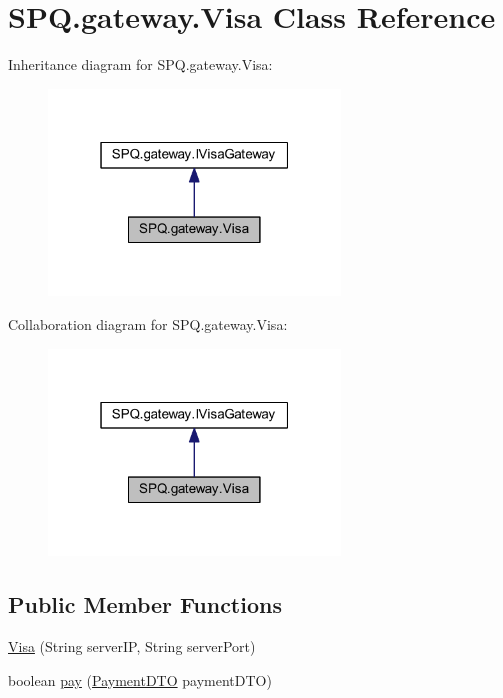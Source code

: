 \hypertarget{class_s_p_q_1_1gateway_1_1_visa}{}\section{S\+P\+Q.\+gateway.\+Visa Class Reference}
\label{class_s_p_q_1_1gateway_1_1_visa}


Inheritance diagram for S\+P\+Q.\+gateway.\+Visa\+:\nopagebreak
\begin{figure}[H]
\begin{center}
\leavevmode
\includegraphics[width=220pt]{class_s_p_q_1_1gateway_1_1_visa__inherit__graph}
\end{center}
\end{figure}


Collaboration diagram for S\+P\+Q.\+gateway.\+Visa\+:\nopagebreak
\begin{figure}[H]
\begin{center}
\leavevmode
\includegraphics[width=220pt]{class_s_p_q_1_1gateway_1_1_visa__coll__graph}
\end{center}
\end{figure}
\subsection*{Public Member Functions}
\begin{DoxyCompactItemize}
\item 
\mbox{\hyperlink{class_s_p_q_1_1gateway_1_1_visa_ae3db27f4e13da7b9d7d9496a1b5eeb91}{Visa}} (String server\+IP, String server\+Port)
\item 
boolean \mbox{\hyperlink{class_s_p_q_1_1gateway_1_1_visa_a0ecda0414a0685174ec12ae96c8d3a68}{pay}} (\mbox{\hyperlink{class_s_p_q_1_1dto_1_1_payment_d_t_o}{Payment\+D\+TO}} payment\+D\+TO)
\end{DoxyCompactItemize}


